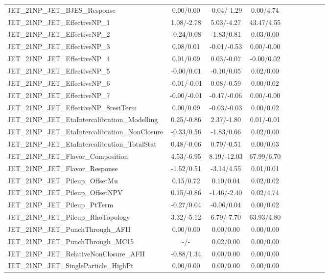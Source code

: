 \begin{table}[h]
\begin{center}
\begin{tabular}{l|ccccccccc}
JET\_21NP\_JET\_BJES\_Response &0.00/0.00 &-0.04/-1.29 &0.00/4.74 \\
JET\_21NP\_JET\_EffectiveNP\_1 &1.08/-2.78 &5.03/-4.27 &43.47/4.55 \\
JET\_21NP\_JET\_EffectiveNP\_2 &-0.24/0.08 &-1.83/0.81 &0.03/0.00 \\
JET\_21NP\_JET\_EffectiveNP\_3 &0.08/0.01 &-0.01/-0.53 &0.00/-0.00 \\
JET\_21NP\_JET\_EffectiveNP\_4 &0.01/0.09 &0.03/-0.07 &-0.00/0.02 \\
JET\_21NP\_JET\_EffectiveNP\_5 &-0.00/0.01 &-0.10/0.05 &0.02/0.00 \\
JET\_21NP\_JET\_EffectiveNP\_6 &-0.01/-0.01 &0.08/-0.59 &0.00/0.02 \\
JET\_21NP\_JET\_EffectiveNP\_7 &-0.00/-0.01 &-0.47/-0.06 &0.00/-0.00 \\
JET\_21NP\_JET\_EffectiveNP\_8restTerm &0.00/0.09 &-0.03/-0.03 &0.00/0.02 \\
JET\_21NP\_JET\_EtaIntercalibration\_Modelling &0.25/-0.86 &2.37/-1.80 &0.01/-0.01 \\
JET\_21NP\_JET\_EtaIntercalibration\_NonClosure &-0.33/0.56 &-1.83/0.66 &0.02/0.00 \\
JET\_21NP\_JET\_EtaIntercalibration\_TotalStat &0.48/-0.06 &0.79/-0.51 &0.00/0.03 \\
JET\_21NP\_JET\_Flavor\_Composition &4.53/-6.95 &8.19/-12.03 &67.99/6.70 \\
JET\_21NP\_JET\_Flavor\_Response &-1.52/0.51 &-3.14/4.55 &0.01/0.01 \\
JET\_21NP\_JET\_Pileup\_OffsetMu &0.15/0.72 &0.10/0.04 &0.02/0.02 \\
JET\_21NP\_JET\_Pileup\_OffsetNPV &0.15/-0.86 &-1.46/-2.40 &0.02/4.74 \\
JET\_21NP\_JET\_Pileup\_PtTerm &-0.27/0.04 &-0.06/0.04 &0.00/0.02 \\
JET\_21NP\_JET\_Pileup\_RhoTopology &3.32/-5.12 &6.79/-7.70 &63.93/4.80 \\
JET\_21NP\_JET\_PunchThrough\_AFII &0.00/0.00 &0.00/0.00 &0.00/0.00 \\
JET\_21NP\_JET\_PunchThrough\_MC15 &-/- &0.02/0.00 &0.00/0.00 \\
JET\_21NP\_JET\_RelativeNonClosure\_AFII &-0.88/1.34 &0.00/0.00 &0.00/0.00 \\
JET\_21NP\_JET\_SingleParticle\_HighPt &0.00/0.00 &0.00/0.00 &0.00/0.00 \\
\hline
\end{tabular}
\end{center}
\end{table}
